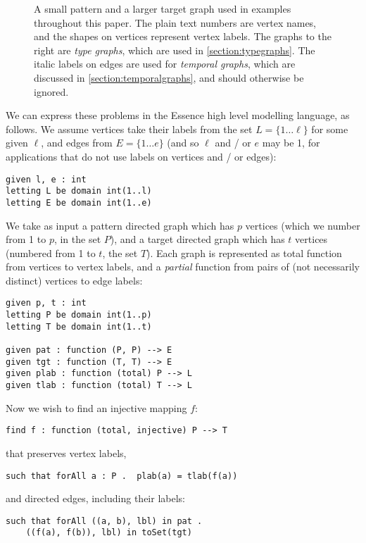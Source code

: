 \documentclass[runningheads]{llncs}
\begin{document}
\begin{figure}[tb]
    \caption{A small pattern and a larger target graph used in examples throughout this paper. The
    plain text numbers are vertex names, and the shapes on vertices represent vertex labels. The
    graphs to the right are \emph{type graphs}, which are used in \cref{section:typegraphs}. The
    italic labels on edges are used for \emph{temporal graphs}, which are discussed in
    \cref{section:temporalgraphs}, and should otherwise be ignored.}
    \label{figure:littlegraphs}
\end{figure}

We can express these problems in the Essence high level modelling language, as follows. We assume
vertices take their labels from the set $L = \{ 1\ldots\ell \}$ for some given $\ell$, and edges
from $E = \{ 1\ldots{}e \}$ (and so $\ell$ and / or $e$ may be 1, for applications that do not use
labels on vertices and / or edges):
\begin{lstlisting}
given l, e : int
letting L be domain int(1..l)
letting E be domain int(1..e)
\end{lstlisting}
We take as input a pattern directed graph which has $p$ vertices (which we number from 1 to $p$, in
the set $P$), and a target directed graph which has $t$ vertices (numbered from 1 to $t$, the set
$T$). Each graph is represented as total function from vertices to vertex labels, and a
\emph{partial} function from pairs of (not necessarily distinct) vertices to edge labels:
\begin{lstlisting}
given p, t : int
letting P be domain int(1..p)
letting T be domain int(1..t)

given pat : function (P, P) --> E
given tgt : function (T, T) --> E
given plab : function (total) P --> L
given tlab : function (total) T --> L
\end{lstlisting}
Now we wish to find an injective mapping $f$:
\begin{lstlisting}
find f : function (total, injective) P --> T
\end{lstlisting}
that preserves vertex labels,
\begin{lstlisting}
such that forAll a : P .  plab(a) = tlab(f(a))
\end{lstlisting}
and directed edges, including their labels:
\begin{lstlisting}
such that forAll ((a, b), lbl) in pat .
    ((f(a), f(b)), lbl) in toSet(tgt)
\end{lstlisting}
\end{document}
